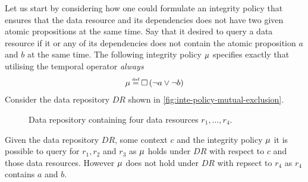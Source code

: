 \begin{example}[]\label{ex:mutual-exclusion}
Let us start by considering how one could formulate an integrity policy that ensures that the data resource and its dependencies does not have two given atomic propositions at the same time. Say that it desired to query a data resource if it or any of its dependencies does not contain the atomic proposition $a$ and $b$ at the same time. The following integrity policy $\mu$ specifies exactly that utilising the temporal operator \emph{always}
\begin{align*}
    \inte \eqdef  \G \left( \lnot a \lor \lnot b \right)
\end{align*}
Consider the data repository $DR$ shown in \autoref{fig:inte-policy-mutual-exclusion}.
\begin{figure}[!ht]
    \begin{center}
        
        \caption{Data repository containing four data resources $r_1, \ldots, r_4$.}
        \label{fig:inte-policy-mutual-exclusion}
    \end{center}
\end{figure}
Given the data repository $DR$, some context $c$ and the integrity policy $\mu$ it is possible to query for $r_1, r_2$ and $r_3$ as $\mu$ holds under $DR$ with respect to $c$ and those data resources. However $\mu$ does not hold under $DR$ with repsect to $r_4$ as $r_4$ contains $a$ and $b$.
\end{example}

